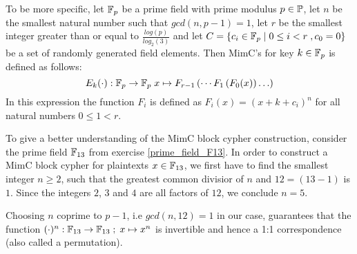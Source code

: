 To be more specific, let $\mathbb{F}_p$ be a prime field with prime modulus $p\in\mathbb{P}$, let $n$ be the smallest natural number such that $gcd(n, p-1) = 1$, let $r$ be the smallest integer greater than or equal to $\frac{log(p)}{log_2(3)}$  and let $C=\{c_i\in \mathbb{F}_p \;|\; 0\leq i < r\; , c_0 =0 \}$ be a set of randomly generated field elements. Then MimC's  for key $k\in \mathbb{F}_p$ is defined as follows: 
\begin{equation}
\label{def:mimc-block-cypher}
E_k(\cdot): \mathbb{F}_p \to \mathbb{F}_p\; x \mapsto F_{r-1}\left(\cdots F_1\left(F_0(x)\right)\ldots\right)
\end{equation}
In this expression the function $F_i$ is defined as $F_i(x)= (x+k+c_i)^n$ for all natural numbers $0\leq 1 < r$.
\begin{example}
\label{ex:mimc-block-cypher-f13}
 To give a better understanding of the MimC block cypher construction, consider the prime field $\mathbb{F}_{13}$ from exercise \ref{prime_field_F13}. In order to construct a MimC block cypher for plaintexts $x\in \mathbb{F}_{13}$, we first have to find the smallest integer $n\geq 2$, such that the greatest common divisior of $n$ and $12=(13-1)$ is $1$. Since the integers $2$, $3$ and $4$ are all factors of $12$, we conclude $n=5$. 

Choosing $n$ coprime to $p-1$, i.e $gcd(n,12)=1$ in our case, guarantees that the function $(\cdot)^n: \mathbb{F}_{13}\to \mathbb{F}_{13}\;;\; x \mapsto x^n$ is invertible and hence a 1:1 correspondence (also called a permutation).


\end{example}
